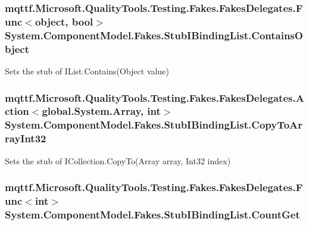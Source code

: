 \hypertarget{class_system_1_1_component_model_1_1_fakes_1_1_stub_i_binding_list_addcf2050e4a2a656d777bacd4673f23e}{
\subsubsection[{Contains\-Object}]{\setlength{\rightskip}{0pt plus 5cm}mqttf.\-Microsoft.\-Quality\-Tools.\-Testing.\-Fakes.\-Fakes\-Delegates.\-Func$<$object, bool$>$ System.\-Component\-Model.\-Fakes.\-Stub\-I\-Binding\-List.\-Contains\-Object}}\label{class_system_1_1_component_model_1_1_fakes_1_1_stub_i_binding_list_addcf2050e4a2a656d777bacd4673f23e}


Sets the stub of I\-List.\-Contains(\-Object value)

\hypertarget{class_system_1_1_component_model_1_1_fakes_1_1_stub_i_binding_list_a0216a8515698361965f81a5d3c0b131b}{
\subsubsection[{Copy\-To\-Array\-Int32}]{\setlength{\rightskip}{0pt plus 5cm}mqttf.\-Microsoft.\-Quality\-Tools.\-Testing.\-Fakes.\-Fakes\-Delegates.\-Action$<$global.\-System.\-Array, int$>$ System.\-Component\-Model.\-Fakes.\-Stub\-I\-Binding\-List.\-Copy\-To\-Array\-Int32}}\label{class_system_1_1_component_model_1_1_fakes_1_1_stub_i_binding_list_a0216a8515698361965f81a5d3c0b131b}


Sets the stub of I\-Collection.\-Copy\-To(\-Array array, Int32 index)

\hypertarget{class_system_1_1_component_model_1_1_fakes_1_1_stub_i_binding_list_a278b7b2de91dc9882a03808e622738b5}{
\subsubsection[{Count\-Get}]{\setlength{\rightskip}{0pt plus 5cm}mqttf.\-Microsoft.\-Quality\-Tools.\-Testing.\-Fakes.\-Fakes\-Delegates.\-Func$<$int$>$ System.\-Component\-Model.\-Fakes.\-Stub\-I\-Binding\-List.\-Count\-Get}}\label{class_system_1_1_component_model_1_1_fakes_1_1_stub_i_binding_list_a278b7b2de91dc9882a03808e622738b5}


